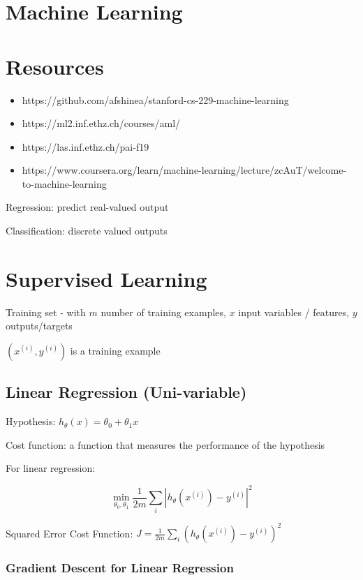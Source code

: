 \section{Machine Learning}

\section{Resources}
\begin{itemize}
\item https://github.com/afshinea/stanford-cs-229-machine-learning
\item https://ml2.inf.ethz.ch/courses/aml/
\item https://las.inf.ethz.ch/pai-f19
\item https://www.coursera.org/learn/machine-learning/lecture/zcAuT/welcome-to-machine-learning
\end{itemize}

Regression: predict real-valued output

Classification: discrete valued outputs

\section{Supervised Learning}

Training set - with $m$ number of training examples, $x$ input variables / features, $y$ outputs/targets

$(x^{(i)},y^{(i)})$ is a training example

\subsection{ Linear Regression (Uni-variable)}

Hypothesis: $h_\theta(x) = \theta_0 + \theta_1x$ 

Cost function: a function that measures the performance of the hypothesis

For linear regression: 

$$\min_{\theta_0,\theta_1} \frac{1}{2m}\sum_i| h_\theta(x^{(i)})-y^{(i)} |^2 $$

Squared Error Cost Function: $J = \frac{1}{2m}\sum_i( h_\theta(x^{(i)})-y^{(i)} )^2 $ 

\subsubsection{Gradient Descent for Linear Regression}


